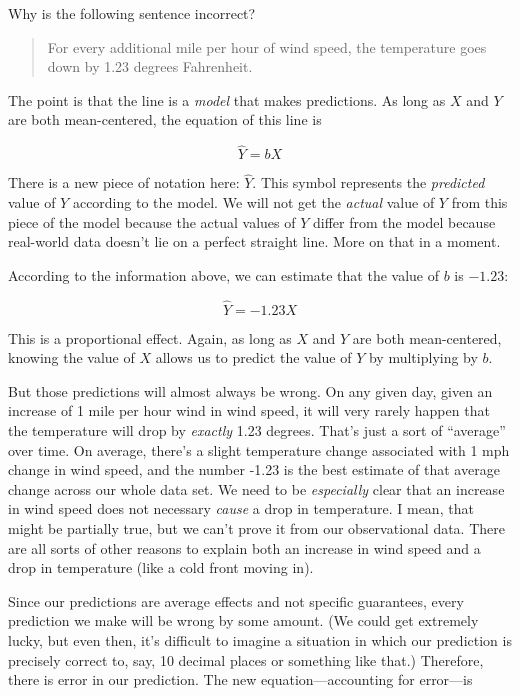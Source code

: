 \documentclass[
]{book}
\begin{document}
Why is the following sentence incorrect?

\begin{quote}
For every additional mile per hour of wind speed, the temperature goes down by 1.23 degrees Fahrenheit.
\end{quote}

The point is that the line is a \emph{model} that makes predictions. As long as \(X\) and \(Y\) are both mean-centered, the equation of this line is

\[
\hat{Y} = bX
\]

There is a new piece of notation here: \(\hat{Y}\). This symbol represents the \emph{predicted} value of \(Y\) according to the model. We will not get the \emph{actual} value of \(Y\) from this piece of the model because the actual values of \(Y\) differ from the model because real-world data doesn't lie on a perfect straight line. More on that in a moment.

According to the information above, we can estimate that the value of \(b\) is \(-1.23\):

\[
\hat{Y} = -1.23X
\]

This is a proportional effect. Again, as long as \(X\) and \(Y\) are both mean-centered, knowing the value of \(X\) allows us to predict the value of \(Y\) by multiplying by \(b\).

But those predictions will almost always be wrong. On any given day, given an increase of 1 mile per hour wind in wind speed, it will very rarely happen that the temperature will drop by \emph{exactly} 1.23 degrees. That's just a sort of ``average'' over time. On average, there's a slight temperature change associated with 1 mph change in wind speed, and the number -1.23 is the best estimate of that average change across our whole data set. We need to be \emph{especially} clear that an increase in wind speed does not necessary \emph{cause} a drop in temperature. I mean, that might be partially true, but we can't prove it from our observational data. There are all sorts of other reasons to explain both an increase in wind speed and a drop in temperature (like a cold front moving in).

Since our predictions are average effects and not specific guarantees, every prediction we make will be wrong by some amount. (We could get extremely lucky, but even then, it's difficult to imagine a situation in which our prediction is precisely correct to, say, 10 decimal places or something like that.) Therefore, there is error in our prediction. The new equation---accounting for error---is
\end{document}
